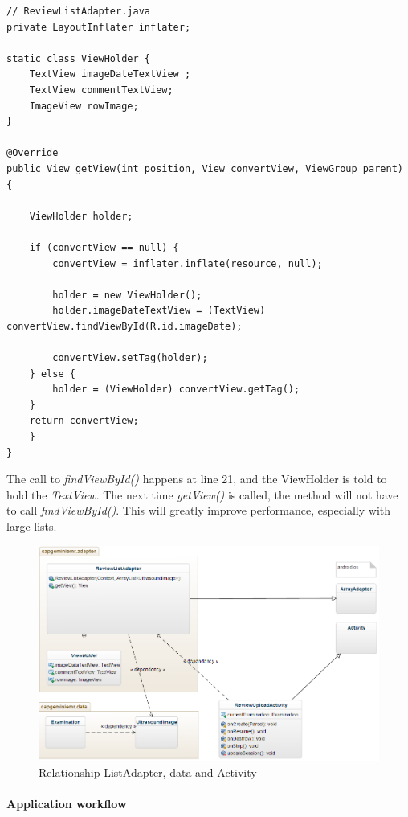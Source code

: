 \newpage

\begin{lstlisting}[caption={ViewHolder implementation}, label={lst:viewholder}]
// ReviewListAdapter.java
private LayoutInflater inflater;

static class ViewHolder {
    TextView imageDateTextView ;
    TextView commentTextView;
    ImageView rowImage;
}

@Override
public View getView(int position, View convertView, ViewGroup parent) {

    ViewHolder holder;

    if (convertView == null) {
        convertView = inflater.inflate(resource, null);

        holder = new ViewHolder();
        holder.imageDateTextView = (TextView) convertView.findViewById(R.id.imageDate);

        convertView.setTag(holder);
    } else {
        holder = (ViewHolder) convertView.getTag();
    }
    return convertView;
    }
}
\end{lstlisting}

\noindent
The call to \emph{findViewById()} happens at line 21, and the ViewHolder is told to hold the \emph{TextView}. The next time \emph{getView()} is called, the method will not have to call \emph{findViewById()}. This will greatly improve performance, especially with large lists.

\begin{figure}[H]
        \includegraphics[scale=0.5]{img/classdiagram2.png}
        \caption{Relationship ListAdapter, data and Activity}
    \label{classdiagram_data_adapter}
\end{figure}


\paragraph{Application workflow}
\label{appworkflow}

